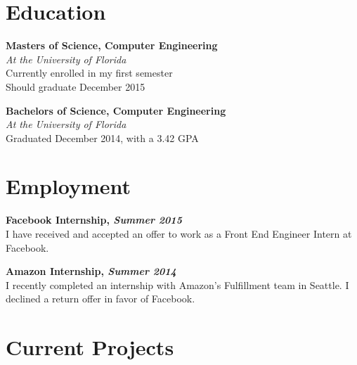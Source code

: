 \documentclass[11pt, letterpaper]{article}
\begin{document}



\section{Education}

\begin{multicols}{2}
\raggedcolumns
\textbf{Masters of Science, Computer Engineering} \\
\textit{At the University of Florida} \\
Currently enrolled in my first semester \\
Should graduate December 2015

\columnbreak

\textbf{Bachelors of Science, Computer Engineering} \\
\textit{At the University of Florida} \\
Graduated December 2014, with a 3.42 GPA
\end{multicols}


\section{Employment}

\begin{multicols}{2}
\raggedcolumns
\textbf{Facebook Internship, \textit{Summer 2015}} \\
I have received and accepted an offer to work as a Front End Engineer Intern
at Facebook.

\columnbreak

\textbf{Amazon Internship, \textit{Summer 2014}} \\
I recently completed an internship with Amazon’s Fulfillment team in Seattle.
I declined a return offer in favor of Facebook.
\end{multicols}

\vfill


\section{Current Projects}

\end{document}
